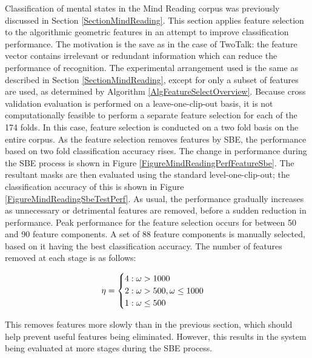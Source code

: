 Classification of mental states in the Mind Reading corpus was previously discussed in Section \ref{SectionMindReading}. This section applies feature selection to the algorithmic geometric features in an attempt to improve classification performance. The motivation is the save as in the case of TwoTalk: the feature vector contains irrelevant or redundant information which can reduce the performance of recognition. The experimental arrangement used is the same as described in Section \ref{SectionMindReading}, except for only a subset of features are used, as determined by Algorithm \ref{AlgFeatureSelectOverview}. Because cross validation evaluation is performed on a leave-one-clip-out basis, it is not computationally feasible to perform a separate feature selection for each of the 174 folds. In this case, feature selection is conducted on a two fold basis on the entire corpus. As the feature selection removes features by \ac{SBE}, the performance based on two fold classification accuracy rises. The change in performance during the \ac{SBE} process is shown in Figure \ref{FigureMindReadingPerfFeatureSbe}. The resultant masks are then evaluated using the standard level-one-clip-out; the classification accuracy of this is shown in Figure \ref{FigureMindReadingSbeTestPerf}. As usual, the performance gradually increases as unnecessary or detrimental features are removed, before a sudden reduction in performance. Peak performance for the feature selection occurs for between 50 and 90 feature components. A set of 88 feature components is manually selected, based on it having the best classification accuracy. The number of features removed at each stage is as follows:

\begin{gather}
\label{EquationNumFeaturesToRemoveMindReading}
\eta = \begin{cases}
4 : \omega > 1000 \\
2 : \omega > 500, \omega \le 1000 \\
1 : \omega \le 500
\end{cases}
\end{gather}

This removes features more slowly than in the previous section, which should help prevent useful features being eliminated. However, this results in the system being evaluated at more stages during the \ac{SBE} process.

